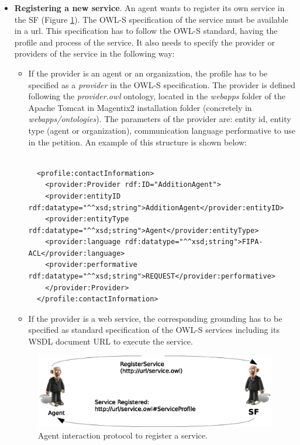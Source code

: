 \begin{itemize}
\item \textbf{Registering a new service}. An agent wants to register its own service in the SF (Figure \ref{fig:registerService}). The OWL-S specification of the service must be available in a url. This specification has to follow the OWL-S standard, having the profile and process of the service. It also needs to specify the provider or providers of the service in the following way:
\begin{itemize}
 \item If the provider is an agent or an organization,  the profile  has to be specified   as a \textit{provider} in the OWL-S specification. The provider is defined following the \textit{provider.owl} ontology, located in the \textit{webapps} folder of the Apache Tomcat in Magentix2 installation folder (concretely in \textit{webapps/ontologies}). The parameters of the provider are: entity id, entity type (agent or organization), communication language performative to use in the petition. An example of this structure is shown below:

 \begin{lstlisting}

  <profile:contactInformation>
    <provider:Provider rdf:ID="AdditionAgent">
	<provider:entityID rdf:datatype="^^xsd;string">AdditionAgent</provider:entityID>
	<provider:entityType rdf:datatype="^^xsd;string">Agent</provider:entityType>
	<provider:language rdf:datatype="^^xsd;string">FIPA-ACL</provider:language>
	<provider:performative rdf:datatype="^^xsd;string">REQUEST</provider:performative>
    </provider:Provider>
  </profile:contactInformation>

 \end{lstlisting}

 \item If the provider is a web service,  the corresponding grounding has to be specified  as standard specification of the OWL-S services including its WSDL document URL to execute the service.

\end{itemize}


\begin{figure}[h!t]
	\centering
	\includegraphics[width=.8\textwidth]{Thomas/images/registerService}
	\caption{Agent interaction protocol to register a service.}
	\label{fig:registerService}
\end{figure}


\end{itemize}
